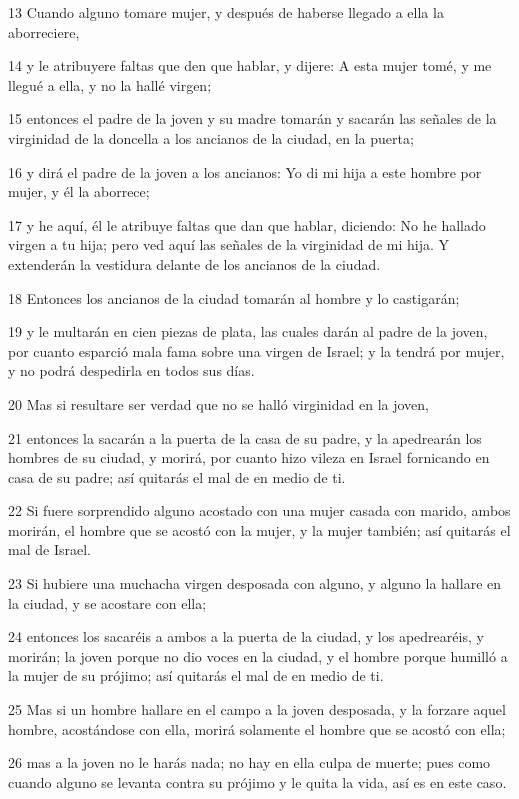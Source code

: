 \par 13 Cuando alguno tomare mujer, y después de haberse llegado a ella la aborreciere,
\par 14 y le atribuyere faltas que den que hablar, y dijere: A esta mujer tomé, y me llegué a ella, y no la hallé virgen;
\par 15 entonces el padre de la joven y su madre tomarán y sacarán las señales de la virginidad de la doncella a los ancianos de la ciudad, en la puerta;
\par 16 y dirá el padre de la joven a los ancianos: Yo di mi hija a este hombre por mujer, y él la aborrece;
\par 17 y he aquí, él le atribuye faltas que dan que hablar, diciendo: No he hallado virgen a tu hija; pero ved aquí las señales de la virginidad de mi hija. Y extenderán la vestidura delante de los ancianos de la ciudad.
\par 18 Entonces los ancianos de la ciudad tomarán al hombre y lo castigarán;
\par 19 y le multarán en cien piezas de plata, las cuales darán al padre de la joven, por cuanto esparció mala fama sobre una virgen de Israel; y la tendrá por mujer, y no podrá despedirla en todos sus días.
\par 20 Mas si resultare ser verdad que no se halló virginidad en la joven,
\par 21 entonces la sacarán a la puerta de la casa de su padre, y la apedrearán los hombres de su ciudad, y morirá, por cuanto hizo vileza en Israel fornicando en casa de su padre; así quitarás el mal de en medio de ti.
\par 22 Si fuere sorprendido alguno acostado con una mujer casada con marido, ambos morirán, el hombre que se acostó con la mujer, y la mujer también; así quitarás el mal de Israel.
\par 23 Si hubiere una muchacha virgen desposada con alguno, y alguno la hallare en la ciudad, y se acostare con ella;
\par 24 entonces los sacaréis a ambos a la puerta de la ciudad, y los apedrearéis, y morirán; la joven porque no dio voces en la ciudad, y el hombre porque humilló a la mujer de su prójimo; así quitarás el mal de en medio de ti.
\par 25 Mas si un hombre hallare en el campo a la joven desposada, y la forzare aquel hombre, acostándose con ella, morirá solamente el hombre que se acostó con ella;
\par 26 mas a la joven no le harás nada; no hay en ella culpa de muerte; pues como cuando alguno se levanta contra su prójimo y le quita la vida, así es en este caso.
